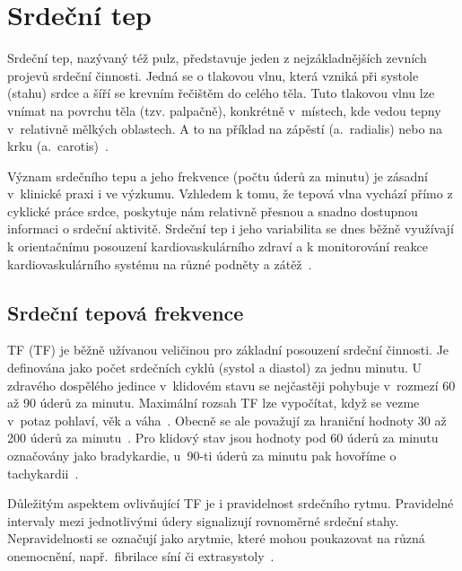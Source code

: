 \chapter{Srdeční tep}
\label{chap:srdecni_tep}

Srdeční tep, nazývaný též pulz, představuje jeden z nejzákladnějších zevních projevů srdeční činnosti.
Jedná se o tlakovou vlnu, která vzniká při systole (stahu) srdce a šíří se krevním řečištěm do celého těla.
Tuto tlakovou vlnu lze vnímat na povrchu těla (tzv. palpačně), konkrétně v~místech, kde vedou tepny v~relativně mělkých oblastech.
A to na příklad na zápěstí (a.~radialis) nebo na krku (a.~carotis)~\cite{ENIKÖ, ucebniceFyziologie}.

Význam srdečního tepu a jeho frekvence (počtu úderů za minutu) je zásadní v~klinické praxi i ve výzkumu.
Vzhledem k tomu, že tepová vlna vychází přímo z cyklické práce srdce, poskytuje nám relativně přesnou a snadno dostupnou informaci o srdeční aktivitě.
Srdeční tep i jeho variabilita se dnes běžně využívají k orientačnímu posouzení kardiovaskulárního zdraví a k monitorování reakce kardiovaskulárního systému na různé podněty a zátěž~\cite{faktoryOvlivnujiciTep}.

\section{Srdeční tepová frekvence}
\label{sec:STF}

\acl{TF} (\acs{TF}) je běžně užívanou veličinou pro základní posouzení srdeční činnosti.
Je definována jako počet srdečních cyklů (systol a diastol) za jednu minutu.
U zdravého dospělého jedince v~klidovém stavu se nejčastěji pohybuje v~rozmezí 60 až 90 úderů za minutu.
Maximální rozsah \acs{TF} lze vypočítat, když se vezme v~potaz pohlaví, věk a váha~\cite{ENIKÖ}. 
Obecně se ale považují za hraniční hodnoty 30 až 200 úderů za minutu~\cite{PyPPG}.
Pro klidový stav jsou hodnoty pod 60 úderů za minutu označovány jako bradykardie, u~90-ti úderů za minutu pak hovoříme o tachykardii~\cite{ENIKÖ, vnitrniLekarstviVKostce}.

Důležitým aspektem ovlivňující \acs{TF} je i pravidelnost srdečního rytmu.
Pravidelné intervaly mezi jednotlivými údery signalizují rovnoměrné srdeční stahy.
Nepravidelnosti se označují jako arytmie, které mohou poukazovat na různá onemocnění, např.~fibrilace síní či extrasystoly~\cite{ENIKÖ}.

